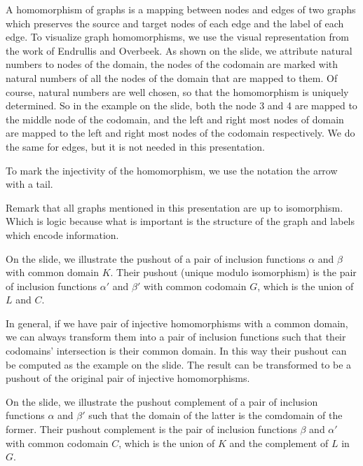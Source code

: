          A homomorphism of graphs is a mapping between nodes and edges of two graphs which preserves the source and target nodes of each edge and the label of each edge.
        To visualize graph homomorphisms, we use the visual representation from the work of Endrullis and Overbeek.
        As shown on the slide, we attribute natural numbers to nodes of the domain, the nodes of the codomain are marked with natural numbers of all the nodes of the domain that are mapped to them. 
        Of course, natural numbers are well chosen, so that the homomorphism is uniquely determined.
        So in the example on the slide, both the node 3 and 4 are mapped to the middle node of the codomain, and the left and right most nodes of domain are mapped to the left and right most nodes of the codomain respectively. We do the same for edges, but it is not needed in this presentation.

        To mark the injectivity of the homomorphism, we use the notation the arrow with a tail.

        Remark that all graphs mentioned in this presentation are up to isomorphism. Which is logic because what is important is the structure of the graph and labels which encode information.





         On the slide, we illustrate the pushout of a pair of inclusion functions $\alpha$ and $\beta$ with common domain $K$. Their pushout (unique modulo isomorphism) is the pair of inclusion functions $\alpha'$ and $\beta'$ with common codomain $G$, which is the union of $L$ and $C$.

         In general, if we have pair of injective homomorphisms with a common domain, we can always transform them into a pair of inclusion functions such that their codomains' intersection is their common domain. In this way their pushout can be computed as the example on the slide. The result can be transformed to be a pushout of the original pair of injective homomorphisms.





          On the slide, we illustrate the pushout complement of a pair of inclusion functions $\alpha$ and $\beta'$ such that the domain of the latter is the comdomain of the former. Their pushout complement is the pair of inclusion functions $\beta$ and $\alpha'$ with common codomain $C$, which is the union of $K$ and the complement of $L$ in $G$.

